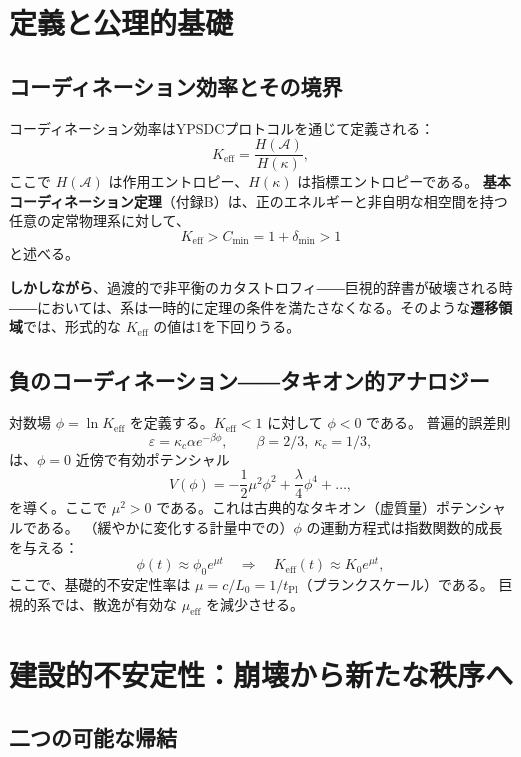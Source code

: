 \documentclass[12pt,a4paper]{article}
\newcommand{\Keff}{K_{\mathrm{eff}}}
\begin{document}
	\section{定義と公理的基礎}
	
	\subsection{コーディネーション効率とその境界}
	
	コーディネーション効率はYPSDCプロトコルを通じて定義される：
	\[
	\Keff = \frac{H(\mathcal{A})}{H(\kappa)},
	\]
	ここで \(H(\mathcal{A})\) は作用エントロピー、\(H(\kappa)\) は指標エントロピーである。
	\textbf{基本コーディネーション定理}（付録B）は、正のエネルギーと非自明な相空間を持つ任意の定常物理系に対して、
	\[
	\Keff > C_{\min} = 1 + \delta_{\min} > 1
	\]
	と述べる。
	
	\textbf{しかしながら}、過渡的で非平衡のカタストロフィ――巨視的辞書が破壊される時――においては、系は一時的に定理の条件を満たさなくなる。そのような\textbf{遷移領域}では、形式的な \(\Keff\) の値は1を下回りうる。
	
	\subsection{負のコーディネーション――タキオン的アナロジー}
	
	対数場 \(\phi = \ln \Keff\) を定義する。\(\Keff < 1\) に対して \(\phi < 0\) である。
	普遍的誤差則
	\[
	\varepsilon = \kappa_c \alpha e^{-\beta \phi}, \qquad \beta = 2/3,\; \kappa_c = 1/3,
	\]
	は、\(\phi = 0\) 近傍で有効ポテンシャル
	\[
	V(\phi) = -\frac{1}{2}\mu^2 \phi^2 + \frac{\lambda}{4}\phi^4 + \dots,
	\]
	を導く。ここで \(\mu^2 > 0\) である。これは古典的なタキオン（虚質量）ポテンシャルである。
	（緩やかに変化する計量中での）\(\phi\) の運動方程式は指数関数的成長を与える：
	\[
	\phi(t) \approx \phi_0 e^{\mu t} \quad\Longrightarrow\quad \Keff(t) \approx K_0 e^{\mu t},
	\]
	ここで、基礎的不安定性率は \(\mu = c/L_0 = 1/t_{\mathrm{Pl}}\)（プランクスケール）である。
	巨視的系では、散逸が有効な \(\mu_{\mathrm{eff}}\) を減少させる。
	
	\section{建設的不安定性：崩壊から新たな秩序へ}
	
	\subsection{二つの可能な帰結}
	
\end{document}

